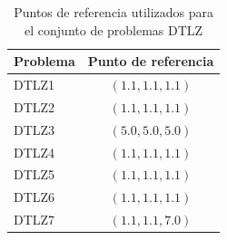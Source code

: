 \DIFaddend \begin{table}
  \begin{center}
    \begin{tabular}{|l||c|}
	\hline
	Problema  & Punto de referencia \\ 
	\hline
	\hline
	DTLZ1 & $(1.1,1.1,1.1)$ \\ 
	\hline
	DTLZ2 &  $(1.1,1.1,1.1)$\\
	\hline
	DTLZ3 &  $(5.0,5.0,5.0)$\\
	\hline
	DTLZ4 &  $(1.1,1.1,1.1)$\\
	\hline
	DTLZ5 &  $(1.1,1.1,1.1)$\\
	\hline
	DTLZ6 &  $(1.1,1.1,1.1)$\\
	\hline
	DTLZ7 &  $(1.1,1.1,7.0)$\\
	\hline
  \end{tabular}
  \caption{Puntos de referencia utilizados para el conjunto de problemas DTLZ}
  \label{tab:refdtlz}
\end{center}
\end{table}
\DIFdelbegin %

